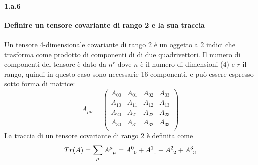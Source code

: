 \documentclass[twoside]{article}
\begin{document}
\paragraph{1.a.6}\textbf{Definire un tensore covariante di rango 2 e la sua traccia}\\
\\
Un tensore 4-dimensionale covariante di rango 2 è un oggetto a 2 indici che trasforma come prodotto di componenti di di due quadrivettori. Il numero di componenti del tensore è dato da $n^r$ dove $n$ è il numero di dimensioni (4) e $r$ il rango, quindi in questo caso sono necessarie 16 componenti, e può essere espresso sotto forma di matrice:
\begin{equation*}
    A_{\mu\nu}=
    \begin{pmatrix}
        A_{00} &A_{01} &A_{02} &A_{03} \\
        A_{10} &A_{11} &A_{12} &A_{13} \\
        A_{20} &A_{21} &A_{22} &A_{23} \\
        A_{30} &A_{31} &A_{32} &A_{33} \\
    \end{pmatrix}
\end{equation*}
La traccia di un tensore covariante di rango 2 è definita come 
\begin{equation*}
    Tr(A)=\sum_{\mu} \tensor{A}{^{\mu}_{\mu}}=\tensor{A}{^0_0}+\tensor{A}{^1_1}+\tensor{A}{^2_2}+\tensor{A}{^3_3}
\end{equation*}
\end{document}
